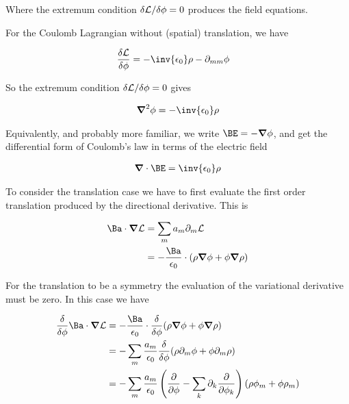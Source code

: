 Where the extremum condition ${\delta \mathcal{L}}/{\delta \phi} = 0$ produces the field equations.

For the Coulomb Lagrangian without (spatial) translation, we have

\begin{align}\label{eqn:rotationCurrents:goo4}
\frac{\delta \LL}{\delta \phi} &=
- \inv{\epsilon_0}\rho - \partial_{mm} \phi 
\end{align}

So the extremum condition ${\delta \mathcal{L}}/{\delta \phi} = 0$ gives

\begin{align}\label{eqn:rotationCurrents:goo5}
\spacegrad^2 \phi = - \inv{\epsilon_0}\rho 
\end{align}

Equivalently, and probably more familiar, we write $\BE = -\spacegrad \phi$, and get the differential form of Coulomb's law in terms of the electric field

\begin{align}\label{eqn:rotationCurrents:goo6}
\spacegrad \cdot \BE = \inv{\epsilon_0}\rho 
\end{align}

To consider the translation case we have to first evaluate the first order translation produced by the directional derivative.  This is

\begin{align*}
\Ba \cdot \spacegrad \LL 
&= \sum_m a_m \partial_m \LL \\
&= -\frac{\Ba}{\epsilon_0} \cdot (\rho \spacegrad \phi + \phi \spacegrad \rho)
\end{align*}

For the translation to be a symmetry the evaluation of the variational derivative must be zero.  In this case we have

\begin{align*}
\frac{\delta }{\delta \phi} \Ba \cdot \spacegrad \LL
&= -\frac{\Ba}{\epsilon_0} \cdot \frac{\delta }{\delta \phi} (\rho \spacegrad \phi + \phi \spacegrad \rho) \\
&= -\sum_m \frac{a_m}{\epsilon_0} \frac{\delta }{\delta \phi} (\rho \partial_m \phi + \phi \partial_m \rho) \\
&= -\sum_m \frac{a_m}{\epsilon_0} \left( \frac{\partial }{\partial \phi} - \sum_k \partial_k \frac{\partial }{\partial \phi_k}\right) (\rho \phi_m + \phi \rho_m) \\
\end{align*}


